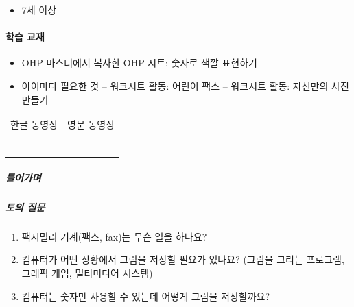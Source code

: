 \documentclass[]{article}
\begin{document}
\begin{itemize}
\itemsep1pt\parskip0pt
\item
  7세 이상
\end{itemize}

\mbox{}\paragraph{학습 교재}\label{section-31}

\begin{itemize}
\itemsep1pt\parskip0pt
\item
  OHP 마스터에서 복사한 OHP 시트: 숫자로 색깔 표현하기
\item
  아이마다 필요한 것 -- 워크시트 활동: 어린이 팩스 -- 워크시트 활동:
  자신만의 사진 만들기
\end{itemize}


\begin{longtable}[c]{@{}ll@{}}
\toprule
\begin{minipage}[t]{0.47\columnwidth}\raggedright\strut
한글 동영상
\strut\end{minipage} &
\begin{minipage}[t]{0.47\columnwidth}\raggedright\strut
영문 동영상
\strut\end{minipage}\tabularnewline
\begin{minipage}[t]{0.47\columnwidth}\raggedright\strut
\begin{center}\rule{0.5\linewidth}{\linethickness}\end{center}
\strut\end{minipage} &
\begin{minipage}[t]{0.47\columnwidth}\raggedright\strut
\strut\end{minipage}\tabularnewline
\bottomrule
\end{longtable}

\subparagraph{들어가며}\label{section-32}

\subparagraph{토의 질문}\label{section-33}

\begin{enumerate}
\itemsep1pt\parskip0pt
\item
  팩시밀리 기계(팩스, fax)는 무슨 일을 하나요?
\item
  컴퓨터가 어떤 상황에서 그림을 저장할 필요가 있나요? (그림을 그리는
  프로그램, 그래픽 게임, 멀티미디어 시스템)
\item
  컴퓨터는 숫자만 사용할 수 있는데 어떻게 그림을 저장할까요?
\end{enumerate}
\end{document}
